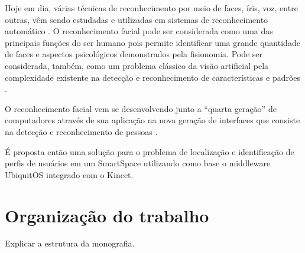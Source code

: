 Hoje em dia, várias técnicas de reconhecimento por meio de faces, íris, voz, entre outras, vêm sendo estudadas e utilizadas em sistemas de reconhecimento automático \cite{bolle}. O reconhecimento facial pode ser considerada como uma das principais funções do ser humano pois permite identificar uma grande quantidade de faces e aspectos psicológicos demonstrados pela fisionomia. Pode ser considerada, também, como um problema clássico da visão artificial pela complexidade existente na detecção e reconhecimento de características e padrões \cite{saocarlos}.

O reconhecimento facial vem se desenvolvendo junto a ``quarta geração'' de computadores através de sua aplicação na nova geração de interfaces que consiste na detecção e reconhecimento de pessoas \cite{saocarlos}.

É proposta então uma solução para o problema de localização e identificação de perfis de usuários em um SmartSpace utilizando como base o middleware UbiquitOS \cite{alegomes} integrado com o Kinect.

\section{Organização do trabalho}

	Explicar a estrutura da monografia.